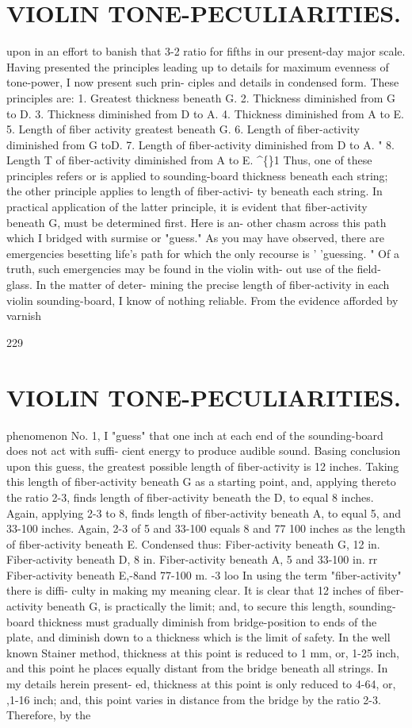 \documentclass{article}
\begin{document}
\section*{VIOLIN TONE-PECULIARITIES.}
upon in an effort to banish that 3-2 ratio for fifths in our present-day major scale. Having presented the principles leading up to details for maximum evenness of tone-power, I now present such prin- ciples and details in condensed form. These principles are: 1. Greatest thickness beneath G. 2. Thickness diminished from G to D. 3. Thickness diminished from D to A. 4. Thickness diminished from A to E. 5. Length of fiber activity greatest beneath G. 6. Length of fiber-activity diminished from G toD. 7. Length of fiber-activity diminished from D to A. " 8. Length T of fiber-activity diminished from A to E. \textasciicircum\{\}1 Thus, one of these principles refers or is applied to sounding-board thickness beneath each string; the other principle applies to length of fiber-activi- ty beneath each string. In practical application of the latter principle, it is evident that fiber-activity beneath G, must be determined first. Here is an- other chasm across this path which I bridged with surmise or "guess." As you may have observed, there are emergencies besetting life's path for which the only recourse is ' 'guessing. " Of a truth, such emergencies may be found in the violin with- out use of the field-glass. In the matter of deter- mining the precise length of fiber-activity in each violin sounding-board, I know of nothing reliable. From the evidence afforded by varnish

229

\section*{VIOLIN TONE-PECULIARITIES.}
phenomenon No. 1, I "guess" that one inch at each end of the sounding-board does not act with suffi- cient energy to produce audible sound. Basing conclusion upon this guess, the greatest possible length of fiber-activity is 12 inches. Taking this length of fiber-activity beneath G as a starting point, and, applying thereto the ratio 2-3, finds length of fiber-activity beneath the D, to equal 8 inches. Again, applying 2-3 to 8, finds length of fiber-activity beneath A, to equal 5, and 33-100 inches. Again, 2-3 of 5 and 33-100 equals 8 and 77 100 inches as the length of fiber-activity beneath E. Condensed thus: Fiber-activity beneath G, 12 in. Fiber-activity beneath D, 8 in. Fiber-activity beneath A, 5 and 33-100 in. rr Fiber-activity beneath E,-8and 77-100 m. -3 loo In using the term "fiber-activity" there is diffi- culty in making my meaning clear. It is clear that 12 inches of fiber-activity beneath G, is practically the limit; and, to secure this length, sounding- board thickness must gradually diminish from bridge-position to ends of the plate, and diminish down to a thickness which is the limit of safety. In the well known Stainer method, thickness at this point is reduced to 1 mm, or, 1-25 inch, and this point he places equally distant from the bridge beneath all strings. In my details herein present- ed, thickness at this point is only reduced to 4-64, or, ,1-16 inch; and, this point varies in distance from the bridge by the ratio 2-3. Therefore, by the
\end{document}
